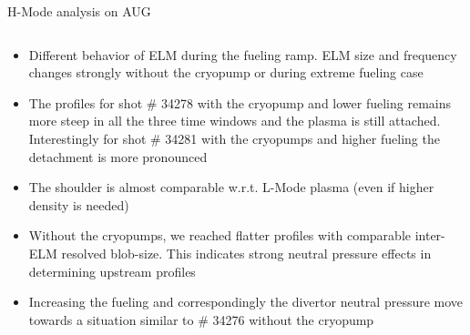 \documentclass[10pt, compress]{beamer}
\begin{document}
\begin{frame}{H-Mode analysis on AUG}
\begin{columns}
\begin{column}{0.45\textwidth}
\begin{itemize}
    \item<2|only@2> Different behavior of ELM during the fueling
      ramp. ELM size and frequency changes strongly without the
      cryopump or during extreme fueling case
    \item<3|only@3> The profiles for shot \# 34278 with the cryopump
      and lower fueling remains more steep in all the three time
      windows and the plasma is still attached. Interestingly for shot \#
      34281 with the cryopumps and higher fueling the detachment is
      more pronounced
    \item<4|only@4> The shoulder is almost comparable 
      w.r.t. L-Mode plasma (even if higher density is needed)
    \item<5|only@5> Without the cryopumps, we reached flatter
         profiles with comparable inter-ELM resolved blob-size. This
         indicates strong neutral pressure effects in determining
         upstream profiles
    \item<6|only@6> Increasing the fueling and correspondingly the
      divertor neutral pressure move towards a situation similar to
      \# 34276 without the cryopump
      \end{itemize}
  \end{column}
\end{columns}
\end{frame}
\end{document}
